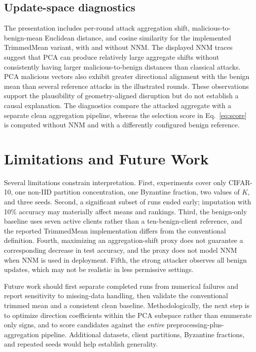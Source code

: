 \documentclass[11pt,a4paper]{article}
\begin{document}
\subsection{Update-space diagnostics}
The presentation includes per-round attack aggregation shift, malicious-to-benign-mean Euclidean distance, and cosine similarity for the implemented TrimmedMean variant, with and without NNM. The displayed NNM traces suggest that PCA can produce relatively large aggregate shifts without consistently having larger malicious-to-benign distances than classical attacks. PCA malicious vectors also exhibit greater directional alignment with the benign mean than several reference attacks in the illustrated rounds. These observations support the plausibility of geometry-aligned disruption but do not establish a causal explanation. The diagnostics compare the attacked aggregate with a separate clean aggregation pipeline, whereas the selection score in Eq.~\eqref{eq:score} is computed without NNM and with a differently configured benign reference.

\section{Limitations and Future Work}
Several limitations constrain interpretation. First, experiments cover only CIFAR-10, one non-IID partition concentration, one Byzantine fraction, two values of $K$, and three seeds. Second, a significant subset of runs ended early; imputation with 10\% accuracy may materially affect means and rankings. Third, the benign-only baseline uses seven active clients rather than a ten-benign-client reference, and the reported TrimmedMean implementation differs from the conventional definition. Fourth, maximizing an aggregation-shift proxy does not guarantee a corresponding decrease in test accuracy, and the proxy does not model NNM when NNM is used in deployment. Fifth, the strong attacker observes all benign updates, which may not be realistic in less permissive settings.

Future work should first separate completed runs from numerical failures and report sensitivity to missing-data handling, then validate the conventional trimmed mean and a consistent clean baseline. Methodologically, the next step is to optimize direction coefficients within the PCA subspace rather than enumerate only signs, and to score candidates against the \emph{entire} preprocessing-plus-aggregation pipeline. Additional datasets, client partitions, Byzantine fractions, and repeated seeds would help establish generality.
\end{document}
